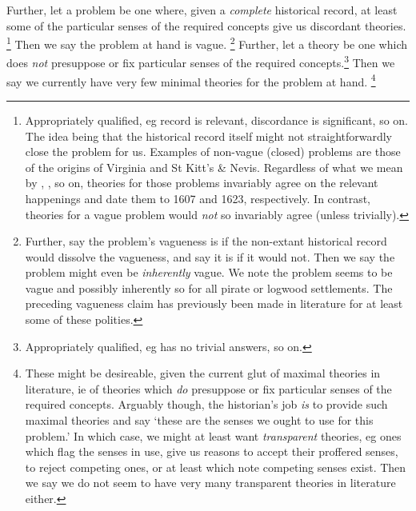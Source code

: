 		Further, let a  problem be one where, given a \emph{complete} historical record, at least some of the particular senses of the required concepts give us discordant theories.%
		\footnote{Appropriately qualified, eg record is relevant, discordance is significant, so on. The idea being that the historical record itself might not straightforwardly close the problem for us. Examples of non-vague (closed) problems are those of the origins of Virginia and St Kitt's \& Nevis. Regardless of what we mean by , , so on, theories for those problems invariably agree on the relevant happenings and date them to 1607 and 1623, respectively. In contrast, theories for a vague problem would \emph{not} so invariably agree (unless trivially).}
		Then we say the problem at hand is vague.%
		\footnote{Further, say the problem's vagueness is  if the non-extant historical record would dissolve the vagueness, and say it is  if it would not. Then we say the problem might even be \emph{inherently} vague. We note the problem seems to be vague and possibly inherently so for all pirate or logwood settlements. The preceding vagueness claim has previously been made in literature for at least some of these polities.}
		Further, let a  theory be one which does \emph{not} presuppose or fix particular senses of the required concepts.\footnote{Appropriately qualified, eg has no trivial answers, so on.} Then we say we currently have very few minimal theories for the problem at hand.%
		\footnote{These might be desireable, given the current glut of maximal theories in literature, ie of theories which \emph{do} presuppose or fix particular senses of the required concepts. Arguably though, the historian's job \emph{is} to provide such maximal theories and say `these are the senses we ought to use for this problem.' In which case, we might at least want \emph{transparent} theories, eg ones which flag the senses in use, give us reasons to accept their proffered senses, to reject competing ones, or at least which note competing senses exist. Then we say we do not seem to have very many transparent theories in literature either.}
%
%
%
